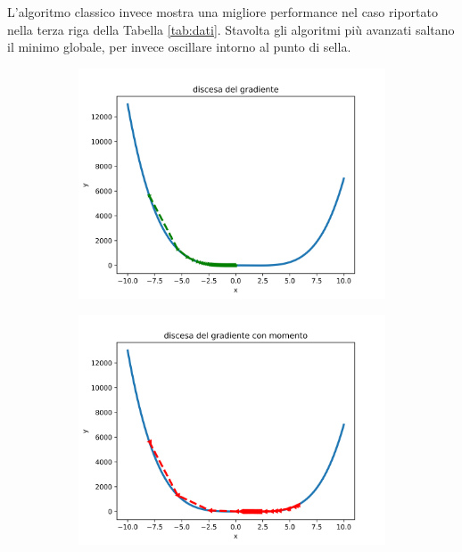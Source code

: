\documentclass{article}
\begin{document}
L'algoritmo classico invece mostra una migliore performance nel caso riportato nella terza riga della Tabella \ref{tab:dati}.
Stavolta gli algoritmi più avanzati saltano il minimo globale, per invece oscillare intorno al punto di sella.

\begin{figure}[!htb]
    \centering
    \begin{subfigure}{.49\textwidth}
       \centering
       \includegraphics[width=1 \textwidth]{images/classico.png}
    \end{subfigure}
    \begin{subfigure}{.49\textwidth}
       \centering
       \includegraphics[width=1\textwidth]{images/momentum.png}
   \end{subfigure} 

\end{figure}
\end{document}
